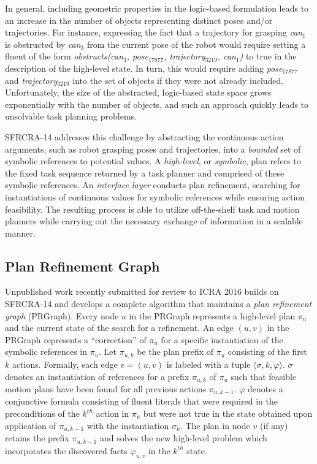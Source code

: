 In general, including geometric properties in the logic-based formulation leads to an
increase in the number of objects representing distinct poses and/or trajectories. For
instance, expressing the fact that a trajectory for grasping \emph{can$_1$} is obstructed by
\emph{can$_3$} from the current pose of the robot would require setting a fluent of the
form \emph{obstructs(can$_3$, pose$_{17877}$, trajectory$_{3219}$, can$_1$)} to true in
the description of the high-level state. In turn, this would require adding
\emph{pose$_{17877}$} and \emph{trajectory$_{3219}$} into the set of objects if they were
not already included. Unfortunately, the size of the abstracted, logic-based state space
grows exponentially with the number of objects, and such an approach quickly leads to
unsolvable task planning problems.

SFRCRA-14 addresses this challenge by abstracting the continuous
action arguments, such as robot grasping poses and trajectories, into
a \emph{bounded} set of symbolic references to potential values. A
\emph{high-level}, or \emph{symbolic}, plan refers to the fixed task
sequence returned by a task planner and comprised of these symbolic
references. An \emph{interface layer} conducts plan refinement,
searching for instantiations of continuous values for symbolic
references while ensuring action feasibility.  The resulting process
is able to utilize off-the-shelf task and motion planners while
carrying out the necessary exchange of information in a scalable
manner.

\subsection{Plan Refinement Graph}
Unpublished work recently submitted for review to ICRA 2016 builds on SFRCRA-14 and develops a complete algorithm
that maintains a \emph{plan refinement graph} (PRGraph). Every node $u$ in the PRGraph
represents a high-level plan $\pi_u$ and the current state of the search
for a refinement. An edge $(u,v)$ in the PRGraph
represents a ``correction'' of $\pi_u$ for a specific instantiation of
the symbolic references in $\pi_u$. Let $\pi_{u,k}$ be the plan prefix of
$\pi_u$ consisting of the first $k$ actions. Formally, each edge
$e=(u,v)$ is labeled with a tuple $\langle \sigma, k, \varphi \rangle$.
$\sigma$ denotes an instantiation of references for a prefix $\pi_{u,k}$ of
$\pi_u$ such that feasible motion plans have been found for all
previous actions $\pi_{u,k-1}$. $\varphi$ denotes a conjunctive formula
consisting of fluent literals
that were required in the preconditions of the $k^{th}$ action in
$\pi_u$ but were not true in the state obtained upon
application of $\pi_{u,k-1}$ with the instantiation $\sigma_k$.  The
plan in node $v$ (if any) retains the prefix $\pi_{u,k-1}$ and solves
the new high-level problem which incorporates the discovered facts $\varphi_{u,v}$
in the $k^{th}$ state.

